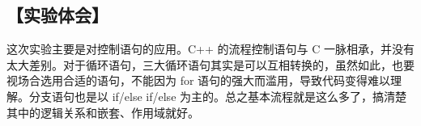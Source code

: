 \subsection*{【实验体会】}
这次实验主要是对控制语句的应用。C++ 的流程控制语句与 C 一脉相承，并没有太大差别。对于循环语句，三大循环语句其实是可以互相转换的，虽然如此，也要视场合选用合适的语句，不能因为 for 语句的强大而滥用，导致代码变得难以理解。分支语句也是以 if/else if/else 为主的。总之基本流程就是这么多了，搞清楚其中的逻辑关系和嵌套、作用域就好。

